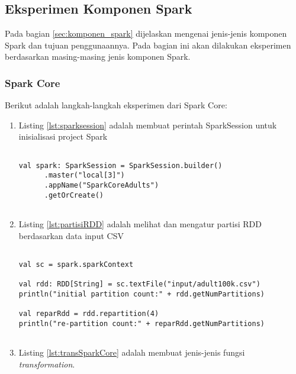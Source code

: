 \newpage
\subsection{Eksperimen Komponen Spark}
Pada bagian \ref{sec:komponen_spark} dijelaskan mengenai jenis-jenis komponen Spark dan tujuan penggunaannya. Pada bagian ini akan dilakukan eksperimen berdasarkan masing-masing jenis komponen Spark.

\subsubsection{Spark Core}
\noindent Berikut adalah langkah-langkah eksperimen dari Spark Core:
\begin{enumerate}

\item Listing \ref{lst:sparksession} adalah membuat perintah SparkSession untuk inisialisasi project Spark
\begin{lstlisting}[basicstyle=\ttfamily, frame=single,
	columns=fullflexible, keepspaces=true, breaklines=true, label=lst:sparksession, caption=Membuat SparkSession]

val spark: SparkSession = SparkSession.builder()
      .master("local[3]")
      .appName("SparkCoreAdults")
      .getOrCreate()	
      
\end{lstlisting}

\item Listing \ref{lst:partisiRDD} adalah melihat dan mengatur partisi RDD berdasarkan data input CSV 
\begin{lstlisting}[basicstyle=\ttfamily, frame=single,
	columns=fullflexible, keepspaces=true, breaklines=true, label=lst:partisiRDD, caption=Melihat dan Mengatur Partisi RDD]
	
val sc = spark.sparkContext

val rdd: RDD[String] = sc.textFile("input/adult100k.csv")
println("initial partition count:" + rdd.getNumPartitions)

val reparRdd = rdd.repartition(4)
println("re-partition count:" + reparRdd.getNumPartitions)	
	
\end{lstlisting}

\item Listing \ref{lst:transSparkCore} adalah membuat jenis-jenis fungsi \textit{transformation}.
\begin{lstlisting}[basicstyle=\ttfamily, frame=single,
	columns=fullflexible, keepspaces=true, breaklines=true, label=lst:transSparkCore, caption=Membuat Fungsi Transformation]
	

\end{lstlisting}
\end{enumerate}
